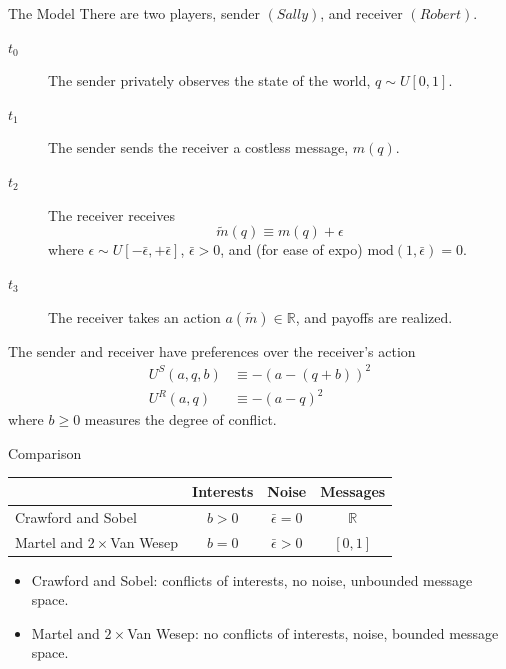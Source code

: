 \documentclass[hyperref={colorlinks=true,linkcolor=blue,citecolor=blue}]{beamer}
\begin{document}
\begin{frame}{The Model}
There are two players, sender $(\textit{Sally})$, and receiver $(\textit{Robert})$. 
\begin{flushleft}
\begin{description}
\item[$t_{0}$] The sender privately observes the state of the world, $q\sim U[0,1]$.
\item[$t_{1}$] The sender sends the receiver a costless message, $m(q)$.
\item[$t_{2}$] The receiver receives
\begin{equation}
\widetilde{m}(q)\equiv m(q)+\epsilon
\end{equation}
where $\epsilon\sim U[-\bar{\epsilon},+\bar{\epsilon}]$, $\bar{\epsilon}>0$, and (for ease of expo) $\text{mod}(1,\bar{\epsilon})=0$.
\item[$t_{3}$] The receiver takes an action $a(\widetilde{m})\in\mathbb{R}$, and payoffs are realized.  
\end{description}
\end{flushleft}
The sender and receiver have preferences over the receiver's action
\begin{align}
U^{S}(a,q,b)&\equiv-(a-(q+b))^{2}\\
U^{R}(a,q)&\equiv-(a-q)^{2}
\end{align}
where $b\geq0$ measures the degree of conflict.
\end{frame}

\begin{frame}{Comparison}
\begin{center}
\begin{tabular}{l|ccc}
& Interests & Noise & Messages\\ \hline
Crawford and Sobel & $b>0$ & $\bar{\epsilon}=0$ & $\mathbb{R}$\\
Martel and $2\times$Van Wesep & $b=0$ & $\bar{\epsilon}>0$ & $[0,1]$
\end{tabular}
\end{center}
\begin{itemize}
\item Crawford and Sobel: conflicts of interests, no noise, unbounded message space. 
\item Martel and $2\times$Van Wesep: no conflicts of interests, noise, bounded message space. 
\end{itemize}
\end{frame}
\end{document}
